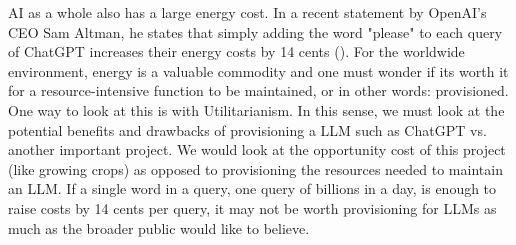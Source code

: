 \documentclass[letterpaper,11pt,leqno]{article}
\begin{document}
AI as a whole also has a large energy cost. In a recent statement by OpenAI's CEO Sam Altman, he states that simply adding the word "please" to each query of ChatGPT increases their energy costs by 14 cents (\cite{AltmanTweet}). For the worldwide environment, energy is a valuable commodity and one must wonder if its worth it for a resource-intensive function to be maintained, or in other words: provisioned. One way to look at this is with Utilitarianism. In this sense, we must look at the potential benefits and drawbacks of provisioning a LLM such as ChatGPT vs. another important project. We would look at the opportunity cost of this project (like growing crops) as opposed to provisioning the resources needed to maintain an LLM. If a single word in a query, one query of billions in a day, is enough to raise costs by 14 cents per query, it may not be worth provisioning for LLMs as much as the broader public would like to believe.

\pagebreak

\printbibliography
\end{document}
